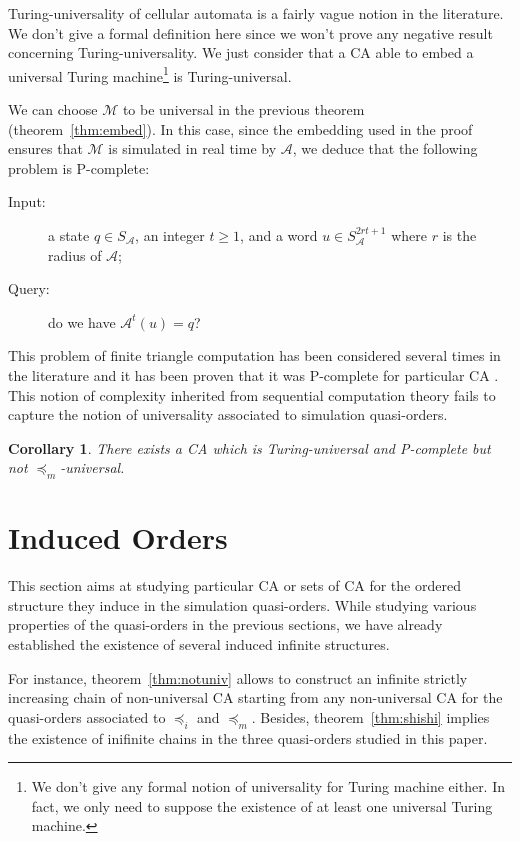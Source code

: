 \documentclass[a4paper]{elsarticle}
\newcommand{\ACA}{\mathcal{A}}
\newcommand\alphabe[1]{S_{#1}}
\newcommand{\alphA}{\alphabe{\ACA}}
\newcommand{\simu}{\preccurlyeq}
\newcommand{\sacsimu}{\simu_i}
\newcommand{\facsacsimu}{\simu_m}
\newcommand\MTM{\mathcal{M}}
\newtheorem{cor}{Corollary}[section]
\begin{document}
Turing-universality of cellular automata is a fairly vague notion in
the literature. We don't give a formal definition here since we won't
prove any negative result concerning Turing-universality. We just
consider that a CA able to embed a universal Turing
machine\footnote{We don't give any formal notion of universality for
  Turing machine either. In fact, we only need to suppose the
  existence of at least one universal Turing machine.} is
Turing-universal.

We can choose $\MTM$ to be universal in the previous theorem
(theorem~\ref{thm:embed}). In this case, since the embedding used in
the proof ensures that $\MTM$ is simulated in real time by $\ACA$, we
deduce that the following problem is P-complete:
\begin{description}
\item[Input:] a state ${q\in\alphA}$, an integer ${t\geq 1}$, and a
  word ${u\in\alphA^{2rt+1}}$ where $r$ is the radius of $\ACA$;
\item[Query:] do we have ${\ACA^t(u)=q}$?
\end{description}
This problem of finite triangle computation has been considered
several times in the literature and it has been proven that it was
P-complete for particular CA \cite{GriffeathMoore, NearyW06}.  This
notion of complexity inherited from sequential computation theory
fails to capture the notion of universality associated to simulation
quasi-orders.

\begin{cor}
  There exists a CA which is Turing-universal and P-complete but not
  $\facsacsimu$-universal.
\end{cor}


\section{Induced Orders}
\label{sec:io}

This section aims at studying particular CA or sets of CA for the
ordered structure they induce in the simulation quasi-orders.  While
studying various properties of the quasi-orders in the previous
sections, we have already established the existence of several induced
infinite structures.

For instance, theorem~\ref{thm:notuniv} allows to construct an
infinite strictly increasing chain of non-universal CA starting from
any non-universal CA for the quasi-orders associated to $\sacsimu$ and
$\facsacsimu$.  Besides, theorem~\ref{thm:shishi} implies the
existence of inifinite chains in the three quasi-orders studied in this
paper.
\end{document}
